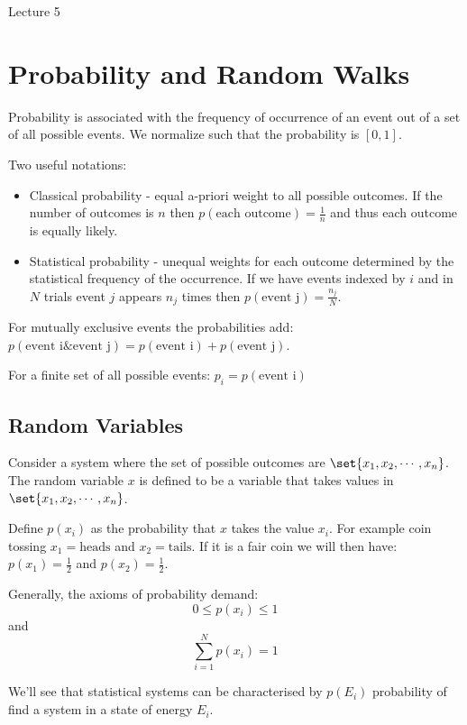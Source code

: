 \begin{center}

Lecture 5

\end{center}

\section{Probability and Random Walks}

Probability is associated with the frequency of occurrence of an event out of a set of all possible events. We normalize such that the probability is $[0,1]$.

Two useful notations:
\begin{itemize}
\item Classical probability - equal a-priori weight to all possible outcomes. If the number of outcomes is $n$ then $p(\text{each outcome}) = \frac{1}{n}$ and thus each outcome is equally likely.
\item Statistical probability - unequal weights for each outcome determined by the statistical frequency of the occurrence. If we have events indexed by $i$ and in $N$ trials event $j$ appears $n_j$ times then $p(\text{event j}) = \frac{n_j}{N}$.
\end{itemize}

For mutually exclusive events the probabilities add: $p(\text{event i} \& \text{event j}) = p(\text{event i}) + p(\text{event j})$.

For a finite set of all possible events: $p_i = p(\text{event i})$

\subsection{Random Variables}

Consider a system where the set of possible outcomes are $\set{x_1, x_2, \cdots, x_n}$. The random variable $x$ is defined to be a variable that takes values in $\set{x_1, x_2, \cdots, x_n}$.

Define $p(x_i)$ as the probability that $x$ takes the value $x_i$. For example coin tossing $x_1 = \text{heads}$ and $x_2 = \text{tails}$. If it is a fair coin we will then have: $p(x_1) = \frac{1}{2}$ and $p(x_2) = \frac{1}{2}$.

Generally, the axioms of probability demand: $$0 \leq p(x_i) \leq 1$$ and $$\sum_{i=1}^N p(x_i) = 1$$

We'll see that statistical systems can be characterised by $p(E_i)$ probability of find a system in a state of energy $E_i$.

